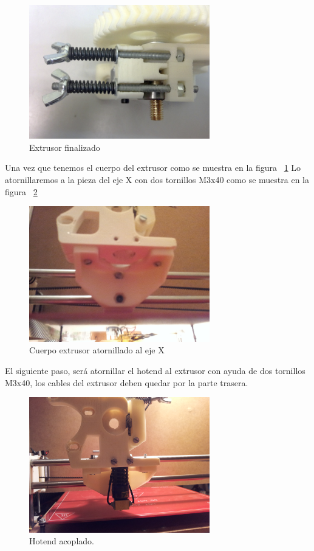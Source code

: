 \begin{figure}[!htp]
	\centering
	\includegraphics[width=0.7\textwidth]{../../Fotos/102.jpg}
	\caption{Extrusor finalizado}
	\label{fig:5.ext}
\end{figure}
Una vez que tenemos el cuerpo del extrusor como se muestra en la figura ~\ref{fig:5.ext} Lo atornillaremos a la pieza del eje X con dos tornillos M3x40 como se muestra en la figura ~\ref{fig:6.ext}
	\begin{figure}[!htp]
		\centering
	\includegraphics[width=0.7\textwidth]{../../Fotos/103.jpg}
	\caption{Cuerpo extrusor atornillado al eje X}
	\label{fig:6.ext}
\end{figure}
El siguiente paso, será atornillar el hotend al extrusor con ayuda de dos tornillos M3x40, los cables del extrusor deben quedar por la parte trasera.
\begin{figure}[!htp]
	\centering
	\includegraphics[width=0.7\textwidth]{../../Fotos/104.jpg}
	\caption{Hotend acoplado.}
	\label{fig:7.ext}
\end{figure}
